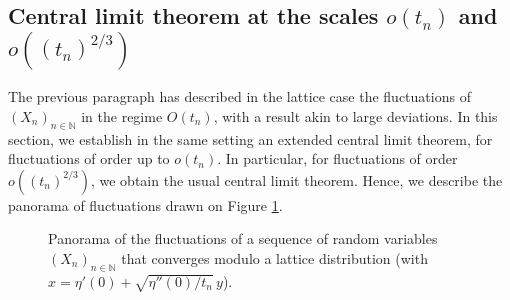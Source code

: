 \documentclass[12pt,a4paper,reqno]{amsart}
\theoremstyle{remark}
\newcommand{\N}{\mathbb{N}}
\newcommand{\R}{\mathbb{R}}
\newcommand{\E}{\mathrm{e}}
\newcommand{\proba}{\mathbb{P}}
\begin{document}
\subsection{Central limit theorem at the scales \texorpdfstring{$o(t_{n})$}{o(tn)} and \texorpdfstring{$o((t_{n})^{2/3})$}{o(tn23)}}
The previous paragraph has described in the lattice case the fluctuations of $(X_n)_{n \in \N}$ in the regime $O(t_n)$, with a result akin to large deviations. In this section, we establish in the same setting an extended central limit theorem, for fluctuations of order up to $o(t_n)$. In particular, for fluctuations of order $o((t_n)^{2/3})$, we obtain the usual central limit theorem. Hence, we describe the panorama of fluctuations drawn on Figure \ref{fig:panoramalattice}.

\begin{center}
\begin{figure}[ht]
\caption{Panorama of the fluctuations of a sequence of random variables $(X_n)_{n\in\N}$ that converges modulo a lattice distribution (with $x=\eta'(0) + \sqrt{\eta''(0)/t_n}\,y$).}\label{fig:panoramalattice}
\end{figure}
\end{center}
\end{document}

